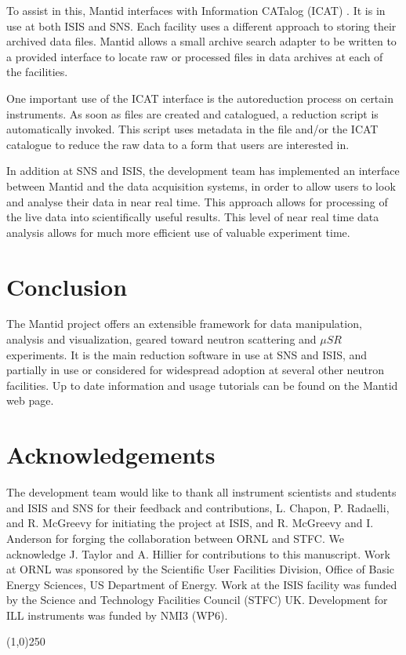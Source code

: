 \documentclass[1p]{elsarticle}
\begin{document}
To assist in this, Mantid interfaces with Information CATalog (ICAT) \cite{ICAT}. 
It is in use at both ISIS and SNS. Each facility uses a different approach to storing their archived data files. Mantid allows a small archive search adapter to be written to a provided interface to locate raw or processed files in data archives at each of the facilities.

One important use of the ICAT interface is the autoreduction process on certain instruments. As soon as files are created and catalogued, a reduction script is automatically invoked. This script uses metadata in the file and/or the ICAT catalogue to reduce the raw data to a form that users are interested in. 

In addition at SNS and ISIS, the development team has implemented an interface between Mantid and the data acquisition systems, in order to allow users to look and analyse their data in near real time. This approach allows for processing of the live data into scientifically useful results. This level of near real time data analysis allows for much more efficient use of valuable experiment time.  


\section{Conclusion}
The Mantid project offers an extensible framework for data manipulation, analysis and visualization, geared toward neutron scattering and $\mu SR$ experiments. It is the main reduction software in use at SNS and ISIS, and partially in use or considered for widespread adoption at several other neutron facilities. Up to date information and usage tutorials can be found on the Mantid web page\cite{webpage}. 

\section{Acknowledgements}
The development team would like to thank all instrument scientists and students and ISIS and SNS for their feedback and contributions, L. Chapon, P. Radaelli, and R. McGreevy for initiating the project at ISIS, and R. McGreevy and I. Anderson for forging the collaboration between ORNL and STFC. We acknowledge J. Taylor and A. Hillier for contributions to this manuscript. Work at ORNL was sponsored by the Scientific User Facilities Division, Office of Basic Energy Sciences, US Department of Energy. Work at the ISIS facility was funded by the Science and Technology Facilities Council (STFC) UK. Development for ILL instruments was funded by NMI3 (WP6).

\begin{center}
\line(1,0){250}
\end{center}


{}

\end{document}
